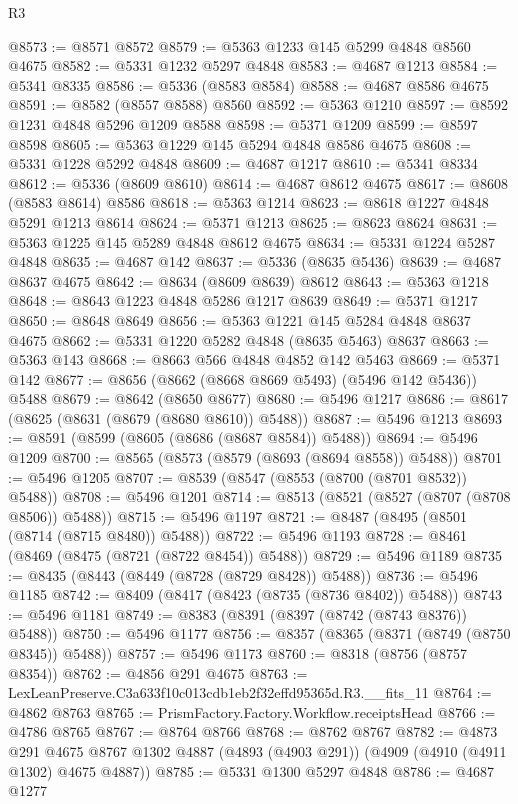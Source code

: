 \begin{lexlean}{R3}
\begin{coremodule}
@8573 := @8571 @8572
@8579 := @5363 @1233 @145 @5299 @4848 @8560 @4675
@8582 := @5331 @1232 @5297 @4848
@8583 := @4687 @1213
@8584 := @5341 @8335
@8586 := @5336 (@8583 @8584)
@8588 := @4687 @8586 @4675
@8591 := @8582 (@8557 @8588) @8560
@8592 := @5363 @1210
@8597 := @8592 @1231 @4848 @5296 @1209 @8588
@8598 := @5371 @1209
@8599 := @8597 @8598
@8605 := @5363 @1229 @145 @5294 @4848 @8586 @4675
@8608 := @5331 @1228 @5292 @4848
@8609 := @4687 @1217
@8610 := @5341 @8334
@8612 := @5336 (@8609 @8610)
@8614 := @4687 @8612 @4675
@8617 := @8608 (@8583 @8614) @8586
@8618 := @5363 @1214
@8623 := @8618 @1227 @4848 @5291 @1213 @8614
@8624 := @5371 @1213
@8625 := @8623 @8624
@8631 := @5363 @1225 @145 @5289 @4848 @8612 @4675
@8634 := @5331 @1224 @5287 @4848
@8635 := @4687 @142
@8637 := @5336 (@8635 @5436)
@8639 := @4687 @8637 @4675
@8642 := @8634 (@8609 @8639) @8612
@8643 := @5363 @1218
@8648 := @8643 @1223 @4848 @5286 @1217 @8639
@8649 := @5371 @1217
@8650 := @8648 @8649
@8656 := @5363 @1221 @145 @5284 @4848 @8637 @4675
@8662 := @5331 @1220 @5282 @4848 (@8635 @5463) @8637
@8663 := @5363 @143
@8668 := @8663 @566 @4848 @4852 @142 @5463
@8669 := @5371 @142
@8677 := @8656 (@8662 (@8668 @8669 @5493) (@5496 @142 @5436)) @5488
@8679 := @8642 (@8650 @8677)
@8680 := @5496 @1217
@8686 := @8617 (@8625 (@8631 (@8679 (@8680 @8610)) @5488))
@8687 := @5496 @1213
@8693 := @8591 (@8599 (@8605 (@8686 (@8687 @8584)) @5488))
@8694 := @5496 @1209
@8700 := @8565 (@8573 (@8579 (@8693 (@8694 @8558)) @5488))
@8701 := @5496 @1205
@8707 := @8539 (@8547 (@8553 (@8700 (@8701 @8532)) @5488))
@8708 := @5496 @1201
@8714 := @8513 (@8521 (@8527 (@8707 (@8708 @8506)) @5488))
@8715 := @5496 @1197
@8721 := @8487 (@8495 (@8501 (@8714 (@8715 @8480)) @5488))
@8722 := @5496 @1193
@8728 := @8461 (@8469 (@8475 (@8721 (@8722 @8454)) @5488))
@8729 := @5496 @1189
@8735 := @8435 (@8443 (@8449 (@8728 (@8729 @8428)) @5488))
@8736 := @5496 @1185
@8742 := @8409 (@8417 (@8423 (@8735 (@8736 @8402)) @5488))
@8743 := @5496 @1181
@8749 := @8383 (@8391 (@8397 (@8742 (@8743 @8376)) @5488))
@8750 := @5496 @1177
@8756 := @8357 (@8365 (@8371 (@8749 (@8750 @8345)) @5488))
@8757 := @5496 @1173
@8760 := @8318 (@8756 (@8757 @8354))
@8762 := @4856 @291 @4675
@8763 := LexLeanPreserve.C3a633f10c013cdb1eb2f32effd95365d.R3.__fits_11
@8764 := @4862 @8763
@8765 := PrismFactory.Factory.Workflow.receiptsHead
@8766 := @4786 @8765
@8767 := @8764 @8766
@8768 := @8762 @8767
@8782 := @4873
    @291
    @4675
    @8767
    @1302
    @4887
    (@4893 (@4903 @291))
    (@4909 (@4910 (@4911 @1302) @4675 @4887))
@8785 := @5331 @1300 @5297 @4848
@8786 := @4687 @1277

\end{coremodule}
\end{lexlean}
